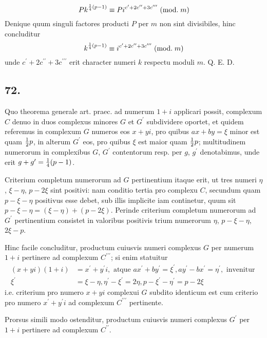 \documentclass[twoside,12pt, showframe]{memoir}
\renewcommand{\pmod}[1]{\;(\textrm{mod.}\;#1)}
\let\oldfrac\frac
\def\frac#1#2{\mathchoice{\tfrac{#1}{#2}}{\oldfrac{#1}{#2}}{\genfrac{}{}{}{2}{#1}{#2\mathstrut}}{\genfrac{}{}{}{3}{#1}{#2\mathstrut}}}
\begin{document}
\[P k^{\frac{1}{4}(p-1)} \equiv P i^{c^{\prime}+2 c^{\prime \prime}+3 c^{\prime \prime \prime}}\pmod{m}\]
Denique quum singuli factores producti \(P\) per \(m\) non sint divisibiles, hinc concluditur
\[k^{\frac{1}{4}(p-1)} \equiv i^{c^{\prime}+2 c^{\prime \prime}+3 c^{\prime \prime \prime}}\pmod{m}\]
unde \(c^{\prime}+2 c^{\prime \prime}+3 c^{\prime \prime \prime}\) erit character numeri \(k\) respectu moduli \(m\). Q. E. D.\clearpage\noindent%

\subsection*{72.}
 
Quo theorema generale art. praec. ad numerum \(1+i\) applicari possit, complexum \(C\) denuo in duos complexus minores \(G\) et \(G^{\prime}\) subdividere oportet, et quidem referemus in complexum \(G\) numeros eos \(x+y i\), pro quibus \(a x+b y=\xi\) minor est quam \(\frac{1}{2} p\), in alterum \(G^{\prime}\) eos, pro quibus \(\xi\) est maior quam \(\frac{1}{2} p\); multitudinem numerorum in complexibus \(G\), \( G^{\prime}\) contentorum resp. per \(g\), \( g^{\prime}\) denotabimus, unde erit \(g+g^{\prime}=\frac{1}{4}(p-1)\).
 
Criterium completum numerorum ad \(G\) pertinentium itaque erit, ut tres numeri \(\eta\), \( \xi-\eta\), \( p-2 \xi\) sint positivi: nam conditio tertia pro complexu \(C\), secundum quam \(p-\xi-\eta\) positivus esse debet, sub illis implicite iam continetur, quum sit \(p-\xi-\eta=(\xi-\eta)+(p-2 \xi)\). Perinde criterium completum numerorum ad \(G^{\prime}\) pertinentium consistet in valoribus positivis trium numerorum \(\eta\), \(p-\xi-\eta\), \( 2 \xi-p\).
 
Hinc facile concluditur, productum cuiusvis numeri complexus \(G\) per numerum \(1+i\) pertinere ad complexum \(C^{\prime \prime \prime}\); si enim statuitur
\[\begin{aligned}
(x+y i)(1+i) & =x^{\prime}+y^{\prime} i, \text{ atque } a x^{\prime}+b y^{\prime}=\xi^{\prime}, a y^{\prime}-b x^{\prime}=\eta^{\prime}, \text{ invenitur } \\
\xi^{\prime} & =\xi-\eta, \eta^{\prime}-\xi^{\prime}=2 \eta, p-\xi^{\prime}-\eta^{\prime}=p-2 \xi
\end{aligned}\]
i.e. criterium pro numero \(x+y i\) complexui \(G\) subdito identicum est cum criterio pro numero \(x^{\prime}+y^{\prime} i\) ad complexum \(C^{\prime \prime \prime}\) pertinente.
 
Prorsus simili modo ostenditur, productum cuiusvis numeri complexus \(G^{\prime}\) per \(1+i\) pertinere ad complexum \(C^{\prime \prime}\).
 
\end{document}
